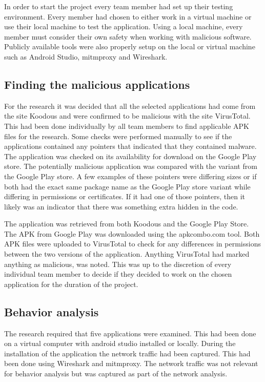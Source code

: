 \documentclass{article}
\begin{document}
In order to start the project every team member had set up their testing environment. Every member had chosen to either work in a virtual machine or use their local machine to test the application. Using a local machine, every member must consider their own safety when working with malicious software. Publicly available tools were also properly setup on the local or virtual machine such as Android Studio, mitmproxy and Wireshark.

\subsection{Finding the malicious applications}

For the research it was decided that all the selected applications had come from the site Koodous and were confirmed to be malicious with the site VirusTotal. This had been done individually by all team members to find applicable APK files for the research. Some checks were performed manually to see if the applications contained any pointers that indicated that they contained malware. The application was checked on its availability for download on the Google Play store. The potentially malicious application was compared with the variant from the Google Play store. A few examples of these pointers were differing sizes or if both had the exact same package name as the Google Play store variant while differing in permissions or certificates. If it had one of those pointers, then it likely was an indicator that there was something extra hidden in the code.

The application was retrieved from both Koodous and the Google Play Store. The APK from Google Play was downloaded using the apkcombo.com tool. Both APK files were uploaded to VirusTotal to check for any differences in permissions between the two versions of the application. Anything VirusTotal had marked anything as malicious, was noted. This was up to the discretion of every individual team member to decide if they decided to work on the chosen application for the duration of the project.

\subsection{Behavior analysis}

The research required that five applications were examined. This had been done on a virtual computer with android studio installed or locally. During the installation of the application the network traffic had been captured. This had been done using Wireshark and mitmproxy. The network traffic was not relevant for behavior analysis but was captured as part of the network analysis.
\end{document}
